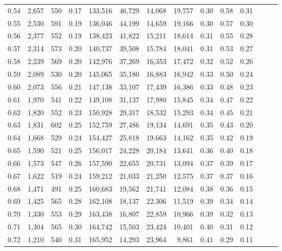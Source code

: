 \begin{tabular}{rrrrrrrrrrrrrr}
0.54 &  2,657 &  550 &  0.17 &  133,516 &   46,729 &  14,068 &  19,757 &  0.30 &  0.58 &      0.31 \\
0.55 &  2,530 &  591 &  0.19 &  136,046 &   44,199 &  14,659 &  19,166 &  0.30 &  0.57 &      0.30 \\
0.56 &  2,377 &  552 &  0.19 &  138,423 &   41,822 &  15,211 &  18,614 &  0.31 &  0.55 &      0.28 \\
0.57 &  2,314 &  573 &  0.20 &  140,737 &   39,508 &  15,784 &  18,041 &  0.31 &  0.53 &      0.27 \\
0.58 &  2,239 &  569 &  0.20 &  142,976 &   37,269 &  16,353 &  17,472 &  0.32 &  0.52 &      0.26 \\
0.59 &  2,089 &  530 &  0.20 &  145,065 &   35,180 &  16,883 &  16,942 &  0.33 &  0.50 &      0.24 \\
0.60 &  2,073 &  556 &  0.21 &  147,138 &   33,107 &  17,439 &  16,386 &  0.33 &  0.48 &      0.23 \\
0.61 &  1,970 &  541 &  0.22 &  149,108 &   31,137 &  17,980 &  15,845 &  0.34 &  0.47 &      0.22 \\
0.62 &  1,820 &  552 &  0.23 &  150,928 &   29,317 &  18,532 &  15,293 &  0.34 &  0.45 &      0.21 \\
0.63 &  1,831 &  602 &  0.25 &  152,759 &   27,486 &  19,134 &  14,691 &  0.35 &  0.43 &      0.20 \\
0.64 &  1,668 &  529 &  0.24 &  154,427 &   25,818 &  19,663 &  14,162 &  0.35 &  0.42 &      0.19 \\
0.65 &  1,590 &  521 &  0.25 &  156,017 &   24,228 &  20,184 &  13,641 &  0.36 &  0.40 &      0.18 \\
0.66 &  1,573 &  547 &  0.26 &  157,590 &   22,655 &  20,731 &  13,094 &  0.37 &  0.39 &      0.17 \\
0.67 &  1,622 &  519 &  0.24 &  159,212 &   21,033 &  21,250 &  12,575 &  0.37 &  0.37 &      0.16 \\
0.68 &  1,471 &  491 &  0.25 &  160,683 &   19,562 &  21,741 &  12,084 &  0.38 &  0.36 &      0.15 \\
0.69 &  1,425 &  565 &  0.28 &  162,108 &   18,137 &  22,306 &  11,519 &  0.39 &  0.34 &      0.14 \\
0.70 &  1,330 &  553 &  0.29 &  163,438 &   16,807 &  22,859 &  10,966 &  0.39 &  0.32 &      0.13 \\
0.71 &  1,304 &  565 &  0.30 &  164,742 &   15,503 &  23,424 &  10,401 &  0.40 &  0.31 &      0.12 \\
0.72 &  1,210 &  540 &  0.31 &  165,952 &   14,293 &  23,964 &   9,861 &  0.41 &  0.29 &      0.11 \\

\end{tabular}
